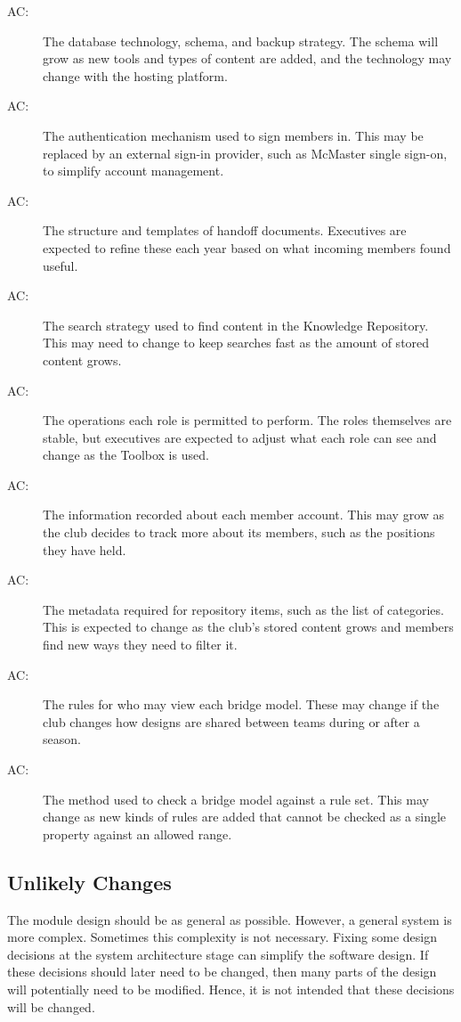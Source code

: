 \documentclass[12pt, titlepage]{article}
\newcounter{acnum}
\newcommand{\actheacnum}{AC\theacnum}
\begin{document}
\begin{description}
\item[ \actheacnum \label{acDB}:]
  The database technology, schema, and backup strategy. The schema will grow as new tools and types of content are added, and the technology may change with the hosting platform.
\item[ \actheacnum \label{acAuth}:]
  The authentication mechanism used to sign members in. This may be replaced by an external sign-in provider, such as McMaster single sign-on, to simplify account management.
\item[ \actheacnum \label{acHandoff}:]
  The structure and templates of handoff documents. Executives are expected to refine these each year based on what incoming members found useful.
\item[ \actheacnum \label{acSearch}:]
  The search strategy used to find content in the Knowledge Repository. This may need to change to keep searches fast as the amount of stored content grows.
\item[ \actheacnum \label{acPermissions}:]
  The operations each role is permitted to perform. The roles themselves are stable, but executives are expected to adjust what each role can see and change as the Toolbox is used.
\item[ \actheacnum \label{acMemberData}:]
  The information recorded about each member account. This may grow as the club decides to track more about its members, such as the positions they have held.
\item[ \actheacnum \label{acItemMetadata}:]
  The metadata required for repository items, such as the list of categories. This is expected to change as the club's stored content grows and members find new ways they need to filter it.
\item[ \actheacnum \label{acModelRecords}:]
  The rules for who may view each bridge model. These may change if the club changes how designs are shared between teams during or after a season.
\item[ \actheacnum \label{acCompliance}:]
  The method used to check a bridge model against a rule set. This may change as new kinds of rules are added that cannot be checked as a single property against an allowed range.
\end{description}

\subsection{Unlikely Changes} \label{SecUchange}
The module design should be as general as possible. However, a general system is more complex. Sometimes this complexity is not necessary. Fixing some design decisions at the system architecture stage can simplify the software design. If these decisions should later need to be changed, then many parts of the design will potentially need to be modified. Hence, it is not intended that these decisions will be changed.
\end{document}
